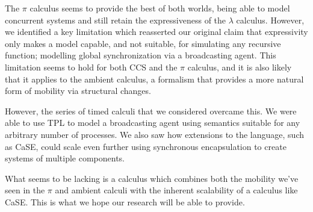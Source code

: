 The $\pi$ calculus seems to provide the best of both worlds, being able
to model concurrent systems and still retain the expressiveness of the
$\lambda$ calculus.  However, we identified a key limitation which
reasserted our original claim that expressivity only makes a model
capable, and not suitable, for simulating any recursive function;
modelling global synchronization via a broadcasting agent.  This
limitation seems to hold for both CCS and the $\pi$ calculus, and it is
also likely that it applies to the ambient calculus, a formalism that
provides a more natural form of mobility via structural changes.

However, the series of timed calculi that we considered overcame this.
We were able to use TPL to model a broadcasting agent using semantics
suitable for any arbitrary number of processes.  We also saw how
extensions to the language, such as CaSE, could scale even further using
synchronous encapsulation to create systems of multiple components.

What seems to be lacking is a calculus which combines both the mobility
we've seen in the $\pi$ and ambient calculi with the inherent
scalability of a calculus like CaSE.  This is what we hope our research
will be able to provide.


